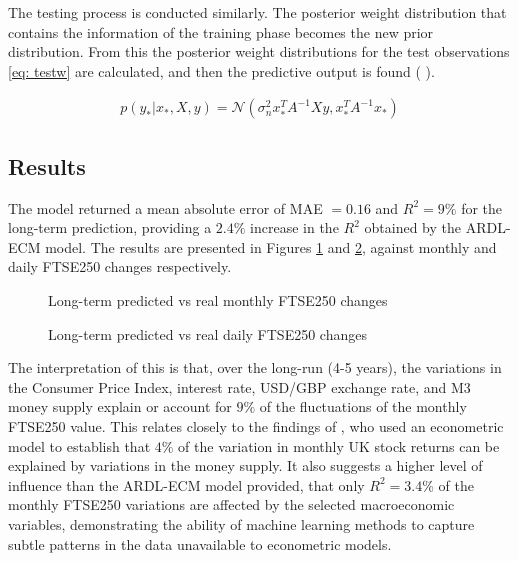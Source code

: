 \documentclass[11pt,a4paper]{article}
\newcommand{\citeboth}[1]{\citeauthor{#1} \citep{#1}}
\begin{document}
The testing process is conducted similarly. The 
posterior weight distribution that contains the information of the training phase becomes the new 
prior distribution. From this the posterior weight distributions for the test observations \eqref{eq: testw}
are calculated, and then the predictive output is found (\citeboth{rasmussen2006}).

\begin{align}
    p(y_{*}|x_{*}, X, y) = \mathcal{N}(\sigma_{n}^{2} x_{*}^{T}A^{-1}Xy, x_{*}^{T}A^{-1}x_{*}) \label{eq: testw}
\end{align}


\subsection{Results}

The model returned a mean absolute error of MAE $=0.16$ and 
$R^2 = 9\%$ for the long-term prediction, providing a 
$2.4\%$ increase in the $R^2$ obtained by the ARDL-ECM model. The results are presented 
in Figures \ref{fig:longmonthly} and \ref{fig:longdaily}, against monthly and daily FTSE250 changes respectively.

\begin{figure}[H]
    \centering
      
    \caption{Long-term predicted vs real monthly FTSE250 changes}
    \label{fig:longmonthly}
\end{figure}

\begin{figure}[H]
    \centering
      
    \caption{Long-term predicted vs real daily FTSE250 changes}
    \label{fig:longdaily}
\end{figure}


The interpretation of this is that, over the long-run (4-5 years), the variations in the 
Consumer Price Index, interest rate, USD/GBP exchange rate, and M3 money 
supply explain or account for $9\%$ of the fluctuations of the
monthly FTSE250 value. This relates closely to the findings of \citeboth{conover1999}, 
who used an econometric model to establish that $4\%$ of the variation in monthly UK stock returns can be 
explained by variations in the money supply. It also suggests a higher level of influence 
than the ARDL-ECM model provided, that only $R^2=3.4\%$ of the monthly FTSE250 variations 
are affected by the selected macroeconomic variables, demonstrating the ability of machine learning
methods to capture subtle patterns in the data unavailable to econometric models. 
\end{document}
